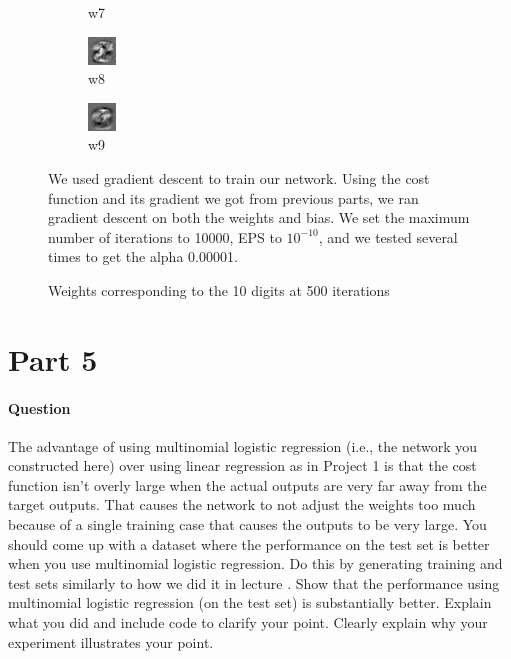 \documentclass[11pt,twoside]{article}
\begin{document}
\begin{figure}[h]
\begin{subfigure}[h]{0.08\textwidth}
	\caption*{w7}
	\end{subfigure}
	\begin{subfigure}[h]{0.08\textwidth}
	\centering
	\includegraphics[scale=1]{w8.jpg}
	\caption*{w8}
	\end{subfigure}
	\begin{subfigure}[h]{0.08\textwidth}
	\centering
	\includegraphics[scale=1]{w9.jpg}
	\caption*{w9}
	\end{subfigure}
\caption*{Weights corresponding to the 10 digits at 500 iterations}

We used gradient descent to train our network. Using the cost function and its gradient we got from previous parts, we ran gradient descent on both the weights and bias. We set the maximum number of iterations to 10000, EPS to $10^{-10}$, and we tested several times to get the alpha 0.00001.
\end{figure}

\clearpage

\section*{Part 5}
\paragraph{Question}
The advantage of using multinomial logistic regression (i.e., the network you constructed here) over using linear regression as in Project 1 is that the cost function isn’t overly large when the actual outputs are very far away from the target outputs. That causes the network to not adjust the weights too much because of a single training case that causes the outputs to be very large. You should come up with a dataset where the performance on the test set is better when you use multinomial logistic regression. Do this by generating training and test sets similarly to how we did it in lecture . Show that the performance using multinomial logistic regression (on the test set) is substantially better. Explain what you did and include code to clarify your point. Clearly explain why your experiment illustrates your point.
\end{document}

